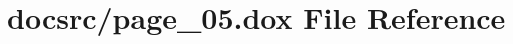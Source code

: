 \hypertarget{page__05_8dox}{\section{docsrc/page\-\_\-05.dox File Reference}
\label{page__05_8dox}
}
